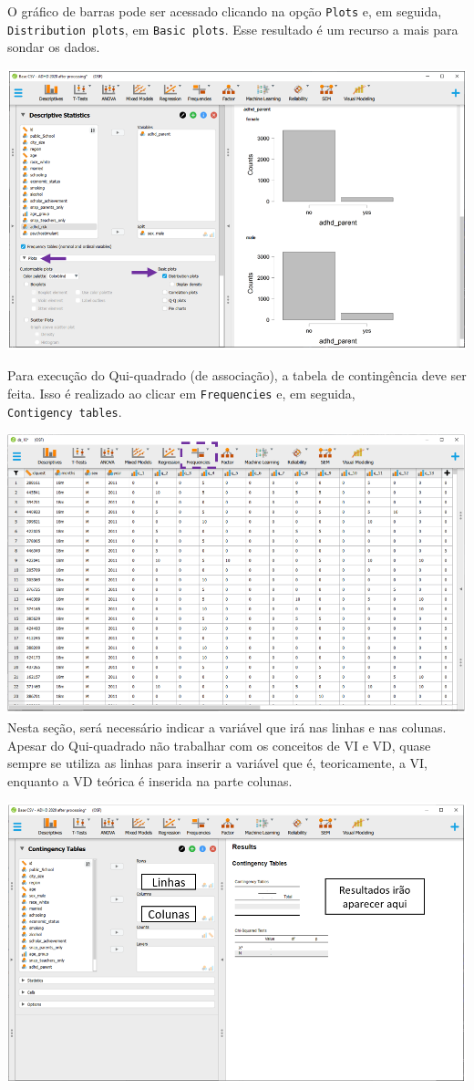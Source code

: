 \documentclass[
]{book}
\begin{document}
O gráfico de barras pode ser acessado clicando na opção \texttt{Plots} e, em seguida, \texttt{Distribution\ plots}, em \texttt{Basic\ plots}. Esse resultado é um recurso a mais para sondar os dados.

\includegraphics{./img/cap_x2_grafico.png}

Para execução do Qui-quadrado (de associação), a tabela de contingência deve ser feita. Isso é realizado ao clicar em \texttt{Frequencies} e, em seguida, \texttt{Contigency\ tables}.

\includegraphics{./img/cap_x2_interface.png}
Nesta seção, será necessário indicar a variável que irá nas linhas e nas colunas. Apesar do Qui-quadrado não trabalhar com os conceitos de VI e VD, quase sempre se utiliza as linhas para inserir a variável que é, teoricamente, a VI, enquanto a VD teórica é inserida na parte colunas.

\includegraphics{./img/cap_x2_interface2.png}
\end{document}
